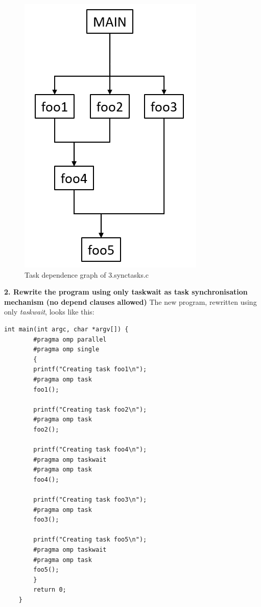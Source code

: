 \documentclass[12]{article}
\begin{document}
\begin{figure}[H]
\centering
\includegraphics[scale=0.5]{images/task_dependence_graph_synctasks.png}
\caption{Task dependence graph of 3.synctasks.c}
\label{task_dependence_graph_synctasks}
\end{figure}

\textbf{2. Rewrite the program using only taskwait as task synchronisation mechanism (no depend clauses allowed)}
 The new program, rewritten using only \textit{taskwait}, looks like this:

 \begin{lstlisting}[frame=single]
    int main(int argc, char *argv[]) {
        #pragma omp parallel
        #pragma omp single
        {
        printf("Creating task foo1\n");
        #pragma omp task
        foo1();

        printf("Creating task foo2\n");
        #pragma omp task
        foo2();

        printf("Creating task foo4\n");
        #pragma omp taskwait
        #pragma omp task
        foo4();

        printf("Creating task foo3\n");
        #pragma omp task
        foo3();

        printf("Creating task foo5\n");
        #pragma omp taskwait
        #pragma omp task
        foo5();
        }
        return 0;
    }
\end{lstlisting}
\end{document}
